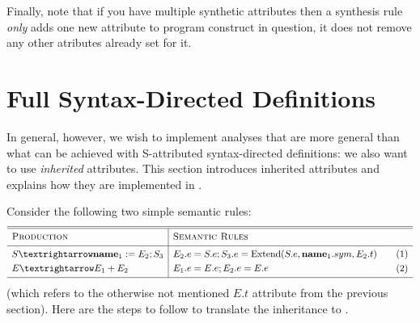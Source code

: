 \documentclass[11pt]{article} %
\begin{document}
Finally, note that if you have multiple synthetic attributes then a synthesis rule \emph{only} adds
one new attribute to program construct in question, it does not remove any other atributes already
set for it.


\section{Full Syntax-Directed Definitions}
\label{sec:sdd}

In general, however, we wish to implement analyses that are more general than what can be achieved
with S-attributed syntax-directed definitions: we also want to use \emph{inherited} attributes.
This section introduces inherited attributes and explains how they are implemented in \HAX.

Consider the following two simple semantic rules:
\begin{equation*}
  \begin{array}{l|ll}
    \hline
    \hline
    \textsc{Production}  & \textsc{Semantic Rules} \Bigstrut&\\
    \hline
    S → \textbf{name}_1 := E_2; S_3
    &
    E_2.e = S.e; 
    S_3.e = \op{Extend}(S.e, \textbf{name}_1.sym, E_2.t) \Bigstrut\quad
    &\thetag{1}
    \\[\jot]
    E → E_1 + E_2
    &
    E_1.e = E.e; E_2.e = E.e
    &\thetag{2}
    \\[\jot]
    \hline
  \end{array}
\end{equation*}
(which refers to the otherwise not mentioned $E.t$ attribute from the previous section). Here are
the steps to follow to translate the inheritance to \HAX.
\end{document}
